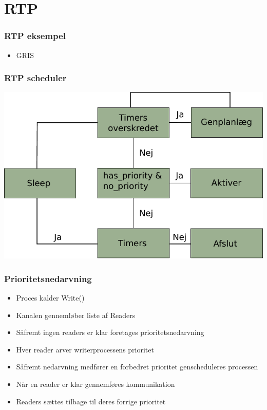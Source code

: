 \documentclass[12pt]{beamer}
\begin{document}
\section{RTP}
\begin{frame}
  \frametitle{RTP eksempel}
  \begin{itemize}   
    \item GRIS
  \end{itemize}
\end{frame}

\begin{frame}
  \frametitle{RTP scheduler}
\includegraphics[scale=0.9]{rtp-scheduler} 
\end{frame}






\begin{frame}
  \frametitle{Prioritetsnedarvning}
\begin{itemize}
	\item Proces kalder Write() 
	\item Kanalen gennemløber liste af Readers
	\item Såfremt ingen readers er klar foretages prioritetsnedarvning
	\item Hver reader arver writerprocessens prioritet 
	\item Såfremt nedarvning medfører en forbedret prioritet genscheduleres processen
	\item Når en reader er klar gennemføres kommunikation
	\item Readers sættes tilbage til deres forrige prioritet
  \end{itemize}
\end{frame}
\end{document}
